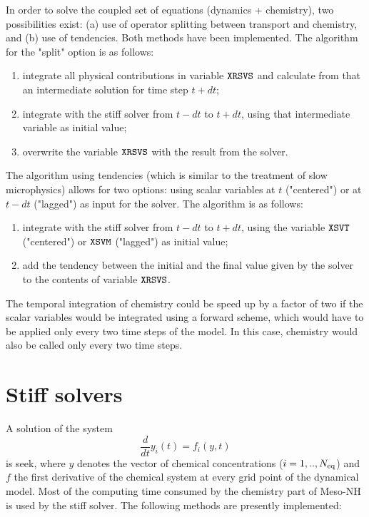 In order to solve the coupled set of equations (dynamics + chemistry), 
two possibilities exist: (a) use of operator splitting between transport
and chemistry, and (b) use of tendencies.
Both methods have been implemented.
The algorithm for the "split" option is as follows:
\begin{enumerate}
  \item integrate all physical contributions in variable $\tt XRSVS$
        and calculate from that an intermediate solution for time step $t+dt$;
  \item integrate with the stiff solver from $t-dt$ to $t+dt$,
        using that intermediate variable as initial value;
  \item overwrite the variable $\tt XRSVS$ with the result from the solver.
\end{enumerate}
The algorithm using tendencies 
(which is similar to the treatment of slow microphysics)
allows for two options: using scalar variables at $t$ ("centered") or
at $t-dt$ ("lagged") as input for the solver. The algorithm is as 
follows:
\begin{enumerate}
  \item integrate with the stiff solver from $t-dt$ to $t+dt$,
        using the variable $\tt XSVT$ ("centered") or $\tt XSVM$ ("lagged")
        as initial value;
  \item add the tendency between the initial and the final value
        given by the solver to the contents of variable $\tt XRSVS$.
\end{enumerate}
The temporal integration of chemistry could be speed up by a factor of two
if the scalar variables would be integrated using a forward scheme,
which would have to be applied only every two time steps of the model.
In this case, chemistry would also be called only every two time steps.
\section{Stiff solvers}
%
A solution of the system
\begin{equation}
  \frac{d}{dt} y_i(t) = f_i (y,t)
\end{equation}
is seek,
where $y$ denotes the vector of chemical concentrations ($i=1,..,N_{\rm eq}$) and
$f$ the first derivative of the chemical system at every grid point of 
the dynamical  model.
Most of the computing time consumed by the chemistry part of Meso-NH
is used by the stiff solver.
The following methods are presently implemented: 


